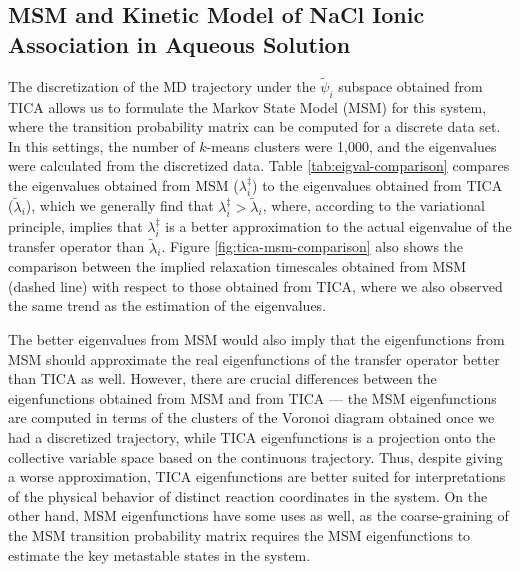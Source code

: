 \begin{spacing}{2.0}
    \subsection{MSM and Kinetic Model of NaCl Ionic Association in Aqueous Solution}

    The discretization of the MD trajectory under the $\tilde{\psi}_i$ subspace obtained from TICA allows us to formulate the Markov State Model 
    (MSM) for this system, where the transition probability matrix can be computed for a discrete data set. In this settings, the number of 
    $k$-means clusters were 1,000, and the eigenvalues were calculated from the discretized data. Table \ref{tab:eigval-comparison} compares the 
    eigenvalues obtained from MSM ($\lambda_i^{\ddagger}$) to the eigenvalues obtained from TICA ($\tilde{\lambda}_i$), which we generally find that 
    $\lambda_i^{\ddagger} > \tilde{\lambda}_i$, where, according to the variational principle, implies that $\lambda_i^{\ddagger}$ is a better 
    approximation to the actual eigenvalue of the transfer operator than $\tilde{\lambda}_i$. Figure \ref{fig:tica-msm-comparison} also shows the 
    comparison between the implied relaxation timescales obtained from MSM (dashed line) with respect to those obtained from TICA, where we also 
    observed the same trend as the estimation of the eigenvalues. 
    
    The better eigenvalues from MSM would also imply that the eigenfunctions from 
    MSM should approximate the real eigenfunctions of the transfer operator better than TICA as well. However, there are crucial differences 
    between the eigenfunctions obtained from MSM and from TICA --- the MSM eigenfunctions are computed in terms of the clusters of the Voronoi 
    diagram obtained once we had a discretized trajectory, while TICA eigenfunctions is a projection onto the collective variable space based on 
    the continuous trajectory. Thus, despite giving a worse approximation, TICA eigenfunctions are better suited for interpretations of the physical 
    behavior of distinct reaction coordinates in the system. On the other hand, MSM eigenfunctions have some uses as well, as the coarse-graining 
    of the MSM transition probability matrix requires the MSM eigenfunctions to estimate the key metastable states in the system. 


\end{spacing}
